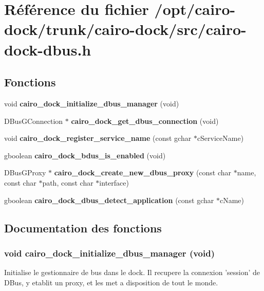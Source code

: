 \section{Référence du fichier /opt/cairo-dock/trunk/cairo-dock/src/cairo-dock-dbus.h}
\label{cairo-dock-dbus_8h}
\subsection*{Fonctions}
\begin{CompactItemize}
\item 
void {\bf cairo\_\-dock\_\-initialize\_\-dbus\_\-manager} (void)
\item 
DBusGConnection $\ast$ {\bf cairo\_\-dock\_\-get\_\-dbus\_\-connection} (void)
\item 
void {\bf cairo\_\-dock\_\-register\_\-service\_\-name} (const gchar $\ast$cServiceName)
\item 
gboolean {\bf cairo\_\-dock\_\-bdus\_\-is\_\-enabled} (void)
\item 
DBusGProxy $\ast$ {\bf cairo\_\-dock\_\-create\_\-new\_\-dbus\_\-proxy} (const char $\ast$name, const char $\ast$path, const char $\ast$interface)
\item 
gboolean {\bf cairo\_\-dock\_\-dbus\_\-detect\_\-application} (const gchar $\ast$cName)
\end{CompactItemize}


\subsection{Documentation des fonctions}
\subsubsection{\setlength{\rightskip}{0pt plus 5cm}void cairo\_\-dock\_\-initialize\_\-dbus\_\-manager (void)}\label{cairo-dock-dbus_8h_649db601a61296129cd1612a2abe7368}


Initialise le gestionnaire de bus dans le dock. Il recupere la connexion 'session' de DBus, y etablit un proxy, et les met a disposition de tout le monde. 
